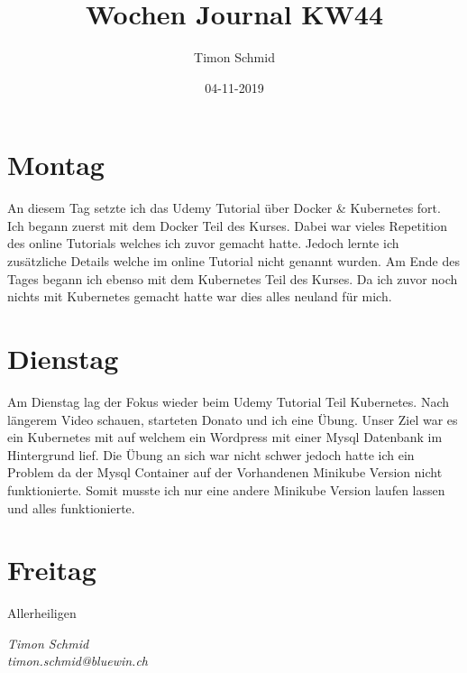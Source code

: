 \documentclass[12pt, titlepage]{article}
\title{Wochen Journal KW44}
\date{04-11-2019}
\author{Timon Schmid}
\begin{document}
  \maketitle

  \newpage


  \section{Montag}
  An diesem Tag setzte ich das Udemy Tutorial über Docker & Kubernetes fort.
  Ich begann zuerst mit dem Docker Teil des Kurses. Dabei war vieles Repetition
  des online Tutorials welches ich zuvor gemacht hatte. Jedoch lernte ich zusätzliche
  Details welche im online Tutorial nicht genannt wurden. Am Ende des Tages begann
  ich ebenso mit dem Kubernetes Teil des Kurses. Da ich zuvor noch nichts mit
  Kubernetes gemacht hatte war dies alles neuland für mich.

  \section{Dienstag}
  Am Dienstag lag der Fokus wieder beim Udemy Tutorial Teil Kubernetes. Nach längerem
  Video schauen, starteten Donato und ich eine Übung. Unser Ziel war es ein Kubernetes
  mit auf welchem ein Wordpress mit einer Mysql Datenbank im Hintergrund lief. Die
  Übung an sich war nicht schwer jedoch hatte ich ein Problem da der Mysql Container
  auf der Vorhandenen Minikube Version nicht funktionierte. Somit musste ich nur eine
  andere Minikube Version laufen lassen und alles funktionierte.

  \section{Freitag}
  Allerheiligen

  \textit{Timon Schmid \\ timon.schmid@bluewin.ch}
\end{document}
